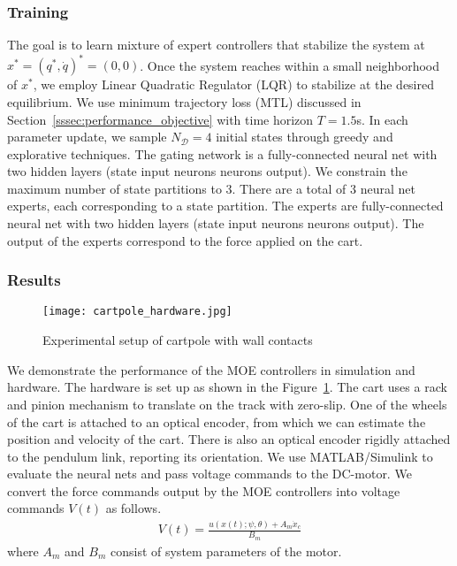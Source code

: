 \subsubsection{Training}
\label{sssec:cartpole_training}

The goal is to learn mixture of expert controllers that stabilize the system at
$x^* = (q^*, \dot{q})^* = (0, 0)$.
%
Once the system reaches within a small neighborhood of $x^*$, we employ Linear
Quadratic Regulator (LQR) to stabilize at the desired equilibrium.
%
We use minimum trajectory loss (MTL) discussed in
Section~\ref{sssec:performance_objective} with time horizon $T=1.5$s.
%
In each parameter update, we sample $N_{\mathcal{D}}=4$ initial states through
greedy and explorative techniques.
%
The gating network is a fully-connected neural net with two hidden layers (state input
 neurons  neurons  output).
% 
We constrain the maximum number of state partitions to 3.
%
There are a total of 3 neural net experts, each corresponding to a state
partition.
%
The experts are fully-connected neural net with two hidden layers (state input
 neurons  neurons  output).
%
The output of the experts correspond to the force applied on the cart.


\subsubsection{Results}
\begin{figure}[tb]
    \centering
    \texttt{[image: cartpole\_hardware.jpg]}
    \caption{Experimental setup of cartpole with wall contacts}
    \label{fig:cartpole_hardware}
\end{figure}

We demonstrate the performance of the MOE controllers in simulation and hardware. 
%
The hardware is set up as shown in the Figure~\ref{fig:cartpole_hardware}.
% 
The cart uses a rack and pinion mechanism to translate on the track with zero-slip.
%
One of the wheels of the cart is attached to an optical encoder, from which we
can estimate the position and velocity of the cart.
%
There is also an optical encoder rigidly attached to the pendulum link,
reporting its orientation. 
%
%
We use MATLAB/Simulink to evaluate the neural nets and pass voltage commands to
the DC-motor.
%
We convert the force commands output by the MOE controllers into voltage
commands $V(t)$ as follows.
\begin{align*}
    V(t) = \frac{u(x(t); \psi, \theta) + A_m \dot{x}_c}{B_m}
\end{align*} 
\noindent where $A_m$ and $B_m$ consist of system parameters of the motor.

